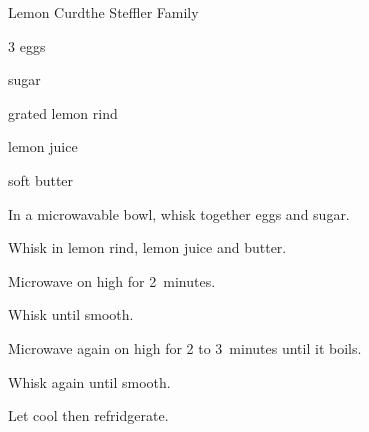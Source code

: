\begin{recipe}{Lemon Curd}{the Steffler Family}{}

\begin{ingredients}
\item 3 eggs
\item \C{\threequarter} sugar
\item {} grated lemon rind
\item \C{\half} lemon juice
\item {} soft butter
\end{ingredients}

\begin{directions}
\item In a microwavable bowl, whisk together eggs and sugar.
\item Whisk in lemon rind, lemon juice and butter.
\item Microwave on high for 2~minutes.
\item Whisk until smooth.
\item Microwave again on high for 2 to 3~minutes until it boils.
\item Whisk again until smooth.
\item Let cool then refridgerate.
\end{directions}

\end{recipe}
